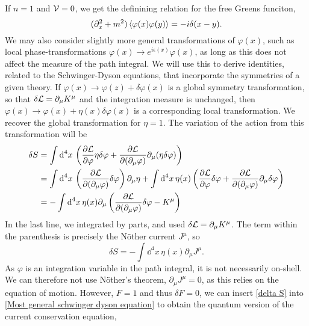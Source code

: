 If $n = 1$ and $\mathcal{V} = 0$, we get the definining relation for the free Greens funciton,
%
\begin{equation}
    (\partial^2_x + m^2)\braket{\varphi(x)\varphi(y)}
    = -i \delta(x - y).
\end{equation}
%
We may also consider slightly more general transformations of $\varphi(x)$, such as local phase-transformations $\varphi(x) \rightarrow e^{i\epsilon(x)}\varphi(x)$, as long as this does not affect the measure of the path integral.
We will use this to derive identities, related to the Schwinger-Dyson equations, that incorporate the symmetries of a given theory.
If $\varphi(x) \rightarrow \varphi(z) + \delta \varphi(x)$ is a global symmetry transformation, so that $\delta \mathcal{L} = \partial_\mu K^\mu$ and the integration measure is unchanged, then $\varphi(x) \rightarrow \varphi(x) + \eta(x) \delta \varphi(x)$ is a corresponding local transformation.
We recover the global transformation for $\eta = 1$.
The variation of the action from this transformation will be
%
\begin{align}
    \delta S 
    &= 
    \int \text{d}^4 x \,
    \left(
        \pdv{\mathcal{L}}{\varphi} \eta \delta \varphi
        + \pdv{\mathcal{L}}{(\partial_\mu\varphi) } \partial_\mu (\eta \delta \varphi)
    \right)\\
    & =
    \int \text{d}^4 x \, \left( \pdv{\mathcal{L}}{(\partial_\mu \varphi)} \delta \varphi \right) \partial_\mu \eta
    + \int \text{d}^4 x \, \eta(x)
    \left( 
        \pdv{\mathcal{L}}{\varphi} \delta \varphi 
        + \pdv{\mathcal{L}}{(\partial_\mu \varphi)} \partial_\mu \delta \varphi  
    \right)\\
    &=
    - \int \text{d}^4 x \, \eta(x) \partial_\mu 
    \left(  \pdv{\mathcal{L}}{(\partial_\mu \varphi)} \delta \varphi - K^\mu \right)
\end{align}
%
In the last line, we integrated by parts, and used $\delta \mathcal{L} = \partial_\mu K^\mu$.
The term within the parenthesis is precisely the Nõther current $J^\mu$, so
%
\begin{equation}
    \label{delta S}
    \delta S = - \int \dd^4 x \, \eta(x) \partial_\mu J^\mu.
\end{equation}
%
As $\varphi$ is an integration variable in the path integral, it is not necessarily on-shell.
We can therefore not use Nöther's theorem, $\partial_\mu J^\mu = 0$, as this relies on the equation of motion.
However, $F = 1$ and thus $\delta F = 0$, we can insert \autoref{delta S} into \autoref{Most general schwinger dyson equation} to obtain the quantum version of the current conservation equation,
